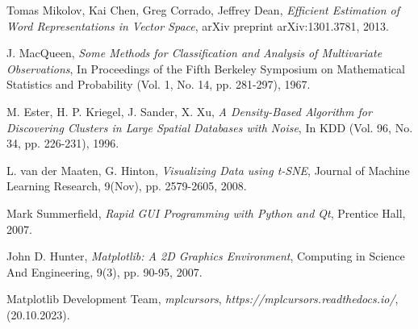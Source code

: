 \begin{thebibliography}{9}
Tomas Mikolov, Kai Chen, Greg Corrado, Jeffrey Dean, \emph{Efficient Estimation of Word Representations in Vector Space}, arXiv preprint arXiv:1301.3781, 2013.

J. MacQueen, \emph{Some Methods for Classification and Analysis of Multivariate Observations}, In Proceedings of the Fifth Berkeley Symposium on Mathematical Statistics and Probability (Vol. 1, No. 14, pp. 281-297), 1967.

M. Ester, H. P. Kriegel, J. Sander, X. Xu, \emph{A Density-Based Algorithm for Discovering Clusters in Large Spatial Databases with Noise}, In KDD (Vol. 96, No. 34, pp. 226-231), 1996.

L. van der Maaten, G. Hinton, \emph{Visualizing Data using t-SNE}, Journal of Machine Learning Research, 9(Nov), pp. 2579-2605, 2008.


Mark Summerfield, \emph{Rapid GUI Programming with Python and Qt}, Prentice Hall, 2007.

John D. Hunter, \emph{Matplotlib: A 2D Graphics Environment}, Computing in Science And Engineering, 9(3), pp. 90-95, 2007.

Matplotlib Development Team, \emph{mplcursors}, \emph{https://mplcursors.readthedocs.io/}, (20.10.2023).




\end{thebibliography}

